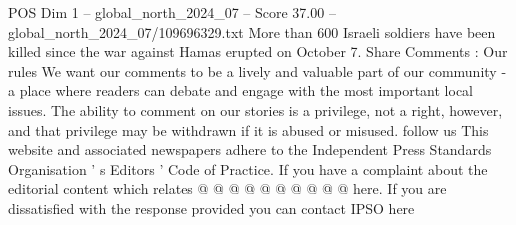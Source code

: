 \begin{textsample}{POS Dim 1 – global\_north\_2024\_07 – Score 37.00 – global\_north\_2024\_07/109696329.txt}
More than 600 Israeli soldiers have been killed since the war against Hamas erupted on October 7.
Share Comments : Our rules We want our comments to be a lively and valuable part of our community - a place where readers can debate and engage with the most important local issues.
The ability to comment on our stories is a privilege, not a right, however, and that privilege may be withdrawn if it is abused or misused. follow us This website and associated newspapers adhere to the Independent Press Standards Organisation ' s Editors ' Code of Practice.
If you have a complaint about the editorial content which relates @ @ @ @ @ @ @ @ @ @ here.
If you are dissatisfied with the response provided you can contact IPSO here

\end{textsample}
